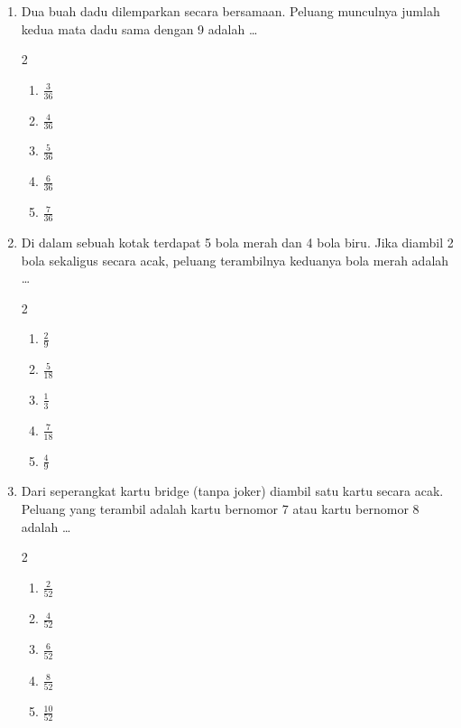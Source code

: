 \documentclass[12pt,a4paper]{article}
\begin{document}
\begin{enumerate}[itemsep=2ex]
    \item Dua buah dadu dilemparkan secara bersamaan. Peluang munculnya jumlah kedua mata dadu sama dengan 9 adalah \dots
    \begin{multicols}{2}
    \begin{enumerate}[label=\Alph*.]
        \item $\frac{3}{36}$
        \item $\frac{4}{36}$
        \item $\frac{5}{36}$
        \item $\frac{6}{36}$
        \item $\frac{7}{36}$
    \end{enumerate}
    \end{multicols}

    \item Di dalam sebuah kotak terdapat 5 bola merah dan 4 bola biru. Jika diambil 2 bola sekaligus secara acak, peluang terambilnya keduanya bola merah adalah \dots
    \begin{multicols}{2}
    \begin{enumerate}[label=\Alph*.]
        \item $\frac{2}{9}$
        \item $\frac{5}{18}$
        \item $\frac{1}{3}$
        \item $\frac{7}{18}$
        \item $\frac{4}{9}$
    \end{enumerate}
    \end{multicols}

    \item Dari seperangkat kartu bridge (tanpa joker) diambil satu kartu secara acak. Peluang yang terambil adalah kartu bernomor 7 atau kartu bernomor 8 adalah \dots
    \begin{multicols}{2}
    \begin{enumerate}[label=\Alph*.]
        \item $\frac{2}{52}$
        \item $\frac{4}{52}$
        \item $\frac{6}{52}$
        \item $\frac{8}{52}$
        \item $\frac{10}{52}$
    \end{enumerate}
    \end{multicols}


\end{enumerate}
\end{document}
